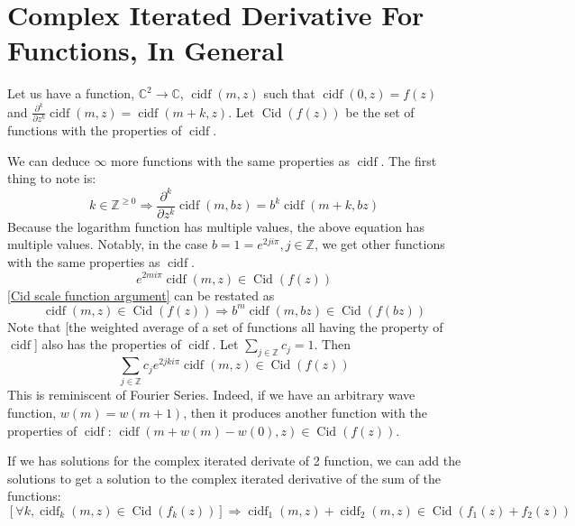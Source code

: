 \documentclass[]{article}
\DeclareMathOperator{\cidf}{cidf}
\DeclareMathOperator{\Cid}{Cid}
\newcommand{\pqty}[1]{{\left(#1\right)}}
\newcommand{\bqty}[1]{{\left[#1\right]}}
\newcommand{\pdiff}[2]{\frac{\partial^{#2}}{\partial #1^{#2}}}
\numberwithin{equation}{section}
\begin{document}
	\section{Complex Iterated Derivative For Functions, In General}
	Let us have a function, $\mathbb{C}^2\to\mathbb{C}$, $\cidf\pqty{m,z}$ such that $\cidf\pqty{0,z}=f\pqty{z}$ and $\pdiff{z}{k}\cidf\pqty{m,z}=\cidf\pqty{m+k,z}$. Let $\Cid\pqty{f\pqty{z}}$ be the set of functions with the properties of $\cidf$.
	
	We can deduce $\infty$ more functions with the same properties as $\cidf$. The first thing to note is:
	\begin{equation}
		\label{Cid scale function argument}
		k\in\mathbb{Z}^{\geq 0}
		\Rightarrow
		\pdiff{z}{k}\cidf\pqty{m,bz}=b^k\cidf\pqty{m+k,bz}
	\end{equation}
	Because the logarithm function has multiple values, the above equation has multiple values. Notably, in the case $b=1=e^{2ji\pi}, j\in\mathbb{Z}$, we get other functions with the same properties as $\cidf$.
	\begin{equation}
		e^{2mi\pi}\cidf\pqty{m,z}\in \Cid\pqty{f\pqty{z}}
	\end{equation}
	\eqref{Cid scale function argument} can be restated as
	\begin{equation}
		\cidf\pqty{m,z}\in\Cid\pqty{f\pqty{z}}
		\Rightarrow
		b^m\cidf\pqty{m,bz}\in\Cid\pqty{f\pqty{bz}}
	\end{equation}
	Note that [the weighted average of a set of functions all having the property of $\cidf$] also has the properties of $\cidf$. Let $\sum_{j\in\mathbb{Z}}c_j=1$. Then
	\begin{equation}
		\sum_{j\in\mathbb{Z}}c_j e^{2jki\pi}\cidf\pqty{m,z}\in \Cid\pqty{f\pqty{z}}
	\end{equation}
	This is reminiscent of Fourier Series. Indeed, if we have an arbitrary wave function, $w\pqty{m}=w\pqty{m+1}$, then it produces another function with the properties of $\cidf$: $\cidf\pqty{m+w\pqty{m}-w\pqty{0},z}\in \Cid\pqty{f\pqty{z}}$.
	
	If we has solutions for the complex iterated derivate of 2 function, we can add the solutions to get a solution to the complex iterated derivative of the sum of the functions:
	\begin{equation}
		\bqty{\forall k,\cidf_k\pqty{m,z}\in\Cid\pqty{f_k\pqty{z}}}
		\Rightarrow
		\cidf_1\pqty{m,z}+\cidf_2\pqty{m,z}\in\Cid\pqty{f_1\pqty{z}+f_2\pqty{z}}
	\end{equation}
	
\end{document}
